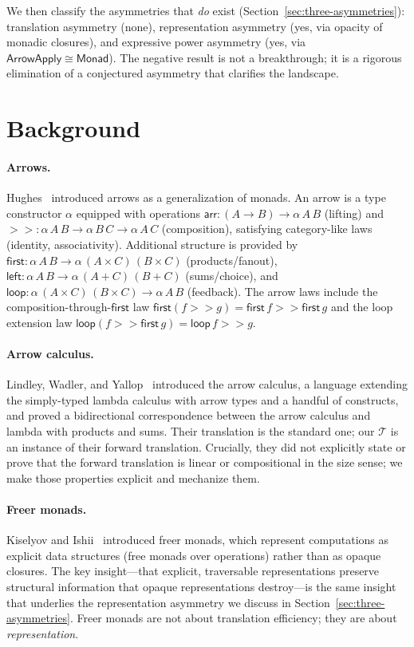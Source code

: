 \documentclass[11pt,a4paper]{article}
\theoremstyle{definition}
\theoremstyle{remark}
\newcommand{\arr}{\mathsf{arr}}
\newcommand{\comp}{\mathbin{>\!\!>}}
\newcommand{\first}{\mathsf{first}}
\newcommand{\leftc}{\mathsf{left}}
\newcommand{\loopop}{\mathsf{loop}}
\newcommand{\ArrowApply}{\mathsf{ArrowApply}}
\newcommand{\T}{\mathcal{T}}
\begin{document}
We then classify the asymmetries that \emph{do} exist
(Section~\ref{sec:three-asymmetries}): translation asymmetry (none),
representation asymmetry (yes, via opacity of monadic closures), and
expressive power asymmetry (yes, via $\ArrowApply \cong \mathsf{Monad}$).
The negative result is not a breakthrough; it is a rigorous elimination of
a conjectured asymmetry that clarifies the landscape.

\section{Background}\label{sec:background}

\paragraph{Arrows.}
Hughes~\cite{hughes2000} introduced arrows as a generalization of monads.
An arrow is a type constructor $\alpha$ equipped with operations
$\arr : (A \to B) \to \alpha\,A\,B$ (lifting) and
$\comp : \alpha\,A\,B \to \alpha\,B\,C \to \alpha\,A\,C$ (composition),
satisfying category-like laws (identity, associativity). Additional
structure is provided by $\first : \alpha\,A\,B \to \alpha\,(A \times C)\,(B \times C)$
(products/fanout), $\leftc : \alpha\,A\,B \to \alpha\,(A + C)\,(B + C)$
(sums/choice), and $\loopop : \alpha\,(A \times C)\,(B \times C) \to \alpha\,A\,B$
(feedback). The arrow laws include the composition-through-$\first$ law
$\first(f \comp g) = \first\,f \comp \first\,g$ and the loop extension law
$\loopop(f \comp \first\,g) = \loopop\,f \comp g$.

\paragraph{Arrow calculus.}
Lindley, Wadler, and Yallop~\cite{lindley2008arrow} introduced the arrow
calculus, a language extending the simply-typed lambda calculus with arrow
types and a handful of constructs, and proved a bidirectional
correspondence between the arrow calculus and lambda with products and
sums. Their translation is the standard one; our $\T$ is an instance of
their forward translation. Crucially, they did not explicitly state or
prove that the forward translation is linear or compositional in the size
sense; we make those properties explicit and mechanize them.

\paragraph{Freer monads.}
Kiselyov and Ishii~\cite{kiselyov2013freer} introduced freer monads, which
represent computations as explicit data structures (free monads over
operations) rather than as opaque closures. The key insight---that explicit,
traversable representations preserve structural information that opaque
representations destroy---is the same insight that underlies the
representation asymmetry we discuss in Section~\ref{sec:three-asymmetries}. Freer
monads are not about translation efficiency; they are about
\emph{representation}.
\end{document}
